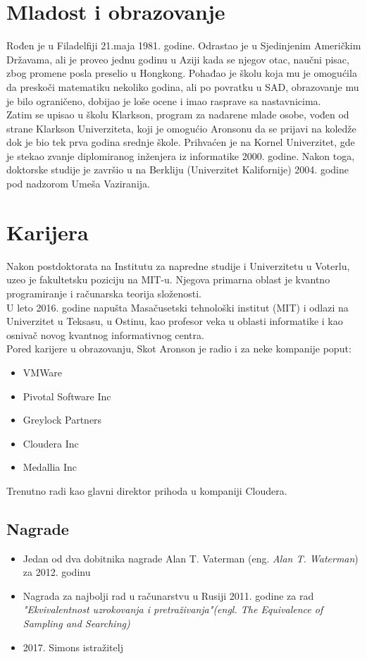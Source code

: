 \documentclass[a4paper]{article}
\begin{document}
{\section{Mladost i obrazovanje}
Rođen je u Filadelfiji 21.maja 1981. godine. Odrastao je u Sjedinjenim Američkim Državama, 
ali je proveo jednu godinu u Aziji kada se njegov otac, naučni pisac, 
zbog promene posla preselio u Hongkong. Pohađao je školu koja mu je omogućila da preskoči 
matematiku nekoliko godina, ali po povratku u SAD, obrazovanje mu je bilo ograničeno, dobijao je loše ocene i imao rasprave sa nastavnicima. 
\\[1\baselineskip]
Zatim se upisao u školu Klarkson, program za nadarene mlade osobe, vođen od strane Klarkson Univerziteta, koji je omogućio 
Aronsonu da se prijavi na koledže dok je bio tek prva godina srednje škole. Prihvaćen je na Kornel Univerzitet, gde je stekao zvanje diplomiranog inženjera iz informatike 2000. godine. 
Nakon toga, doktorske studije je završio u na Berkliju (Univerzitet Kalifornije) 2004. godine pod nadzorom Umeša Vaziranija.
\\[1\baselineskip]

\section{Karijera}
Nakon postdoktorata na Institutu za napredne studije i Univerzitetu u Voterlu, 
uzeo je fakultetsku poziciju na MIT-u. Njegova primarna oblast je kvantno programiranje i računarska teorija složenosti. 
\\[1\baselineskip]
U leto 2016. godine napušta Masačusetski tehnološki institut (MIT) i odlazi na Univerzitet u Teksasu, 
u Ostinu, kao profesor veka u oblasti informatike i kao osnivač novog kvantnog informativnog centra.
\\[1\baselineskip]
Pored karijere u obrazovanju, Skot Aronson je radio i za neke kompanije poput:
\begin{itemize}
\item VMWare
\item Pivotal Software Inc
\item Greylock Partners
\item Cloudera Inc
\item Medallia Inc
\end{itemize}
Trenutno radi kao glavni direktor prihoda u kompaniji Cloudera. \cite{company}


\subsection{Nagrade}
\begin{itemize}
\item Jedan od dva dobitnika nagrade Alan T. Vaterman (eng. \textit{Alan T. Waterman}) za 2012. godinu \cite{nagrada1}
\item Nagrada za najbolji rad u računarstvu u Rusiji 2011. godine za rad \textit{"Ekvivalentnost uzrokovanja i pretraživanja"(engl. The Equivalence of Sampling and Searching)} 
\item 2017. Simons istražitelj \cite{nagrada2}
\end{itemize}



}
\end{document}
